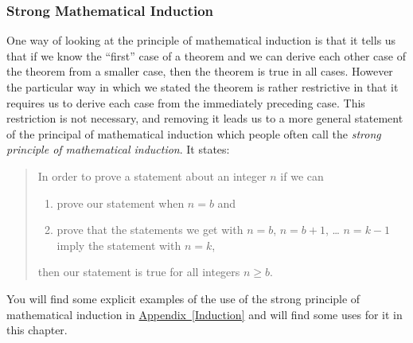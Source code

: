 \documentclass[10pt,]{book}
\theoremstyle{plain}
\theoremstyle{definition}
\numberwithin{equation}{chapter}
\begin{document}
\subsubsection[{Strong Mathematical Induction}]{Strong Mathematical Induction}\label{subsubsection-1}
One way of looking at the principle of mathematical induction is that it tells us that if we know the ``first'' case of a theorem and we can derive each other case of the theorem from a smaller case, then the theorem is true in all cases. However the particular way in which we stated the theorem is rather restrictive in that it requires us to derive each case from the immediately preceding case. This restriction is not necessary, and removing it leads us to a more general statement of the principal of mathematical induction which people often call the \emph{strong principle of mathematical induction}. It states:%
\begin{quote}\hypertarget{blockquote-8}{}
In order to prove a statement about an integer \(n\) if we can \leavevmode%
\begin{enumerate}
\item\hypertarget{li-23}{}prove our statement when \(n=b\) and%
\item\hypertarget{li-24}{}prove that the statements we get with \(n=b\), \(n=b+1\), \dots{} \(n=k-1\) imply the statement with \(n=k\),%
\end{enumerate}
 then our statement is true for all integers \(n\ge b\).\end{quote}
You will find some explicit examples of the use of the strong principle of mathematical induction in \hyperref[Induction]{Appendix~\ref{Induction}} and will find some uses for it in this chapter.%
\typeout{************************************************}
\typeout{************************************************}
\end{document}

